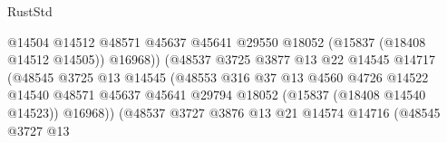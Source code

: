 \begin{lexlean}{RustStd}
\begin{coremodule}
                                                  @14504
                                                  @14512
                                                  @48571
                                                  @45637
                                                  @45641
                                                  @29550
                                                  @18052
                                                  (@15837 (@18408 @14512 @14505))
                                                  @16968))
                                              (@48537
                                                @3725
                                                @3877
                                                @13
                                                @22
                                                @14545
                                                @14717
                                                (@48545
                                                  @3725
                                                  @13
                                                  @14545
                                                  (@48553
                                                    @316
                                                    @37
                                                    @13
                                                    @4560
                                                    @4726
                                                    @14522
                                                    @14540
                                                    @48571
                                                    @45637
                                                    @45641
                                                    @29794
                                                    @18052
                                                    (@15837 (@18408 @14540 @14523))
                                                    @16968))
                                                (@48537
                                                  @3727
                                                  @3876
                                                  @13
                                                  @21
                                                  @14574
                                                  @14716
                                                  (@48545
                                                    @3727
                                                    @13

\end{coremodule}
\end{lexlean}
